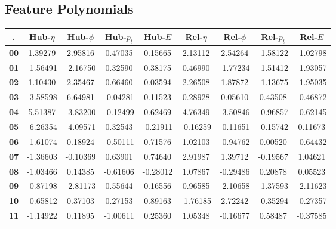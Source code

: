 \subsection{Feature Polynomials}

\begin{tabular}{|c|c|c|c|c|c|c|c|c|}
    \hline
    . & \textbf{Hub-$\eta$} & \textbf{Hub-$\phi$} & \textbf{Hub-$p_t$} & \textbf{Hub-$E$} & \textbf{Rel-$\eta$} & \textbf{Rel-$\phi$} & \textbf{Rel-$p_t$} & \textbf{Rel-$E$} \\
    \hline
    \textbf{00} &  1.39279 &  2.95816 &  0.47035 &  0.15665 &  2.13112 &  2.54264 & -1.58122 & -1.02798 \\ 
    \textbf{01} & -1.56491 & -2.16750 &  0.32590 &  0.38175 &  0.46990 & -1.77234 & -1.51412 & -1.93057 \\ 
    \textbf{02} &  1.10430 &  2.35467 &  0.66460 &  0.03594 &  2.26508 &  1.87872 & -1.13675 & -1.95035 \\ 
    \textbf{03} & -3.58598 &  6.64981 & -0.04281 &  0.11523 &  0.28928 &  0.05610 &  0.43508 & -0.46872 \\ 
    \textbf{04} &  5.51387 & -3.83200 & -0.12499 &  0.62469 &  4.76349 & -3.50846 & -0.96857 & -0.62145 \\ 
    \textbf{05} & -6.26354 & -4.09571 &  0.32543 & -0.21911 & -0.16259 & -0.11651 & -0.15742 &  0.11673 \\ 
    \textbf{06} & -1.61074 &  0.18924 & -0.50111 &  0.71576 &  1.02103 & -0.94762 &  0.00520 & -0.64432 \\ 
    \textbf{07} & -1.36603 & -0.10369 &  0.63901 &  0.74640 &  2.91987 &  1.39712 & -0.19567 &  1.04621 \\ 
    \textbf{08} & -1.03466 &  0.14385 & -0.61606 & -0.28012 &  1.07867 & -0.29486 &  0.20878 &  0.05523 \\ 
    \textbf{09} & -0.87198 & -2.81173 &  0.55644 &  0.16556 &  0.96585 & -2.10658 & -1.37593 & -2.11623 \\ 
    \textbf{10} & -0.65812 &  0.37103 &  0.27153 &  0.89163 & -1.76185 &  2.72242 & -0.35294 & -0.27357 \\ 
    \textbf{11} & -1.14922 &  0.11895 & -1.00611 &  0.25360 &  1.05348 & -0.16677 &  0.58487 & -0.37585 \\
    \hline
\end{tabular}